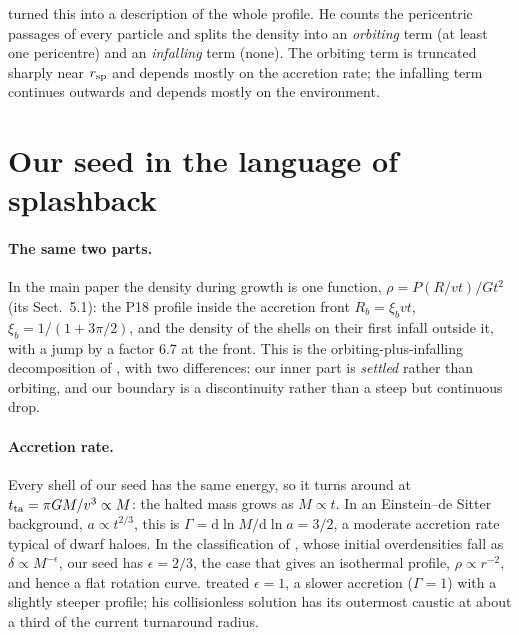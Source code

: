 \documentclass[11pt,a4paper]{article}
\newcommand{\dd}{\mathrm{d}}
\newcommand{\Rb}{R_b}
\newcommand{\rsp}{r_{\rm sp}}
\begin{document}
\citet{Diemer2022} turned this into a description of the whole profile.
He counts the pericentric passages of every particle and splits the
density into an \emph{orbiting} term (at least one pericentre) and an
\emph{infalling} term (none). The orbiting term is truncated sharply near
$\rsp$ and depends mostly on the accretion rate; the infalling term
continues outwards and depends mostly on the environment.

\section{Our seed in the language of splashback}

\paragraph{The same two parts.} In the main paper the density during
growth is one function, $\rho=P(R/vt)/Gt^2$ (its Sect.~5.1): the P18
profile inside the accretion front $\Rb=\xi_bvt$, $\xi_b=1/(1+3\pi/2)$,
and the density of the shells on their first infall outside it, with a
jump by a factor 6.7 at the front. This is the orbiting-plus-infalling
decomposition of \citet{Diemer2022}, with two differences: our inner part
is \emph{settled} rather than orbiting, and our boundary is a
discontinuity rather than a steep but continuous drop.

\paragraph{Accretion rate.} Every shell of our seed has the same energy,
so it turns around at $t_{\rm ta}=\pi GM/v^3\propto M$: the halted mass
grows as $M\propto t$. In an Einstein--de Sitter background, $a\propto
t^{2/3}$, this is $\Gamma=\dd\ln M/\dd\ln a=3/2$, a moderate accretion
rate typical of dwarf haloes. In the classification of
\citet{Fillmore1984}, whose initial overdensities fall as
$\delta\propto M^{-\epsilon}$, our seed has $\epsilon=2/3$, the case
that gives an isothermal profile, $\rho\propto r^{-2}$, and hence a flat
rotation curve. \citet{Bertschinger1985} treated $\epsilon=1$, a slower
accretion ($\Gamma=1$) with a slightly steeper profile; his
collisionless solution has its outermost caustic at about a third of the
current turnaround radius.
\end{document}
